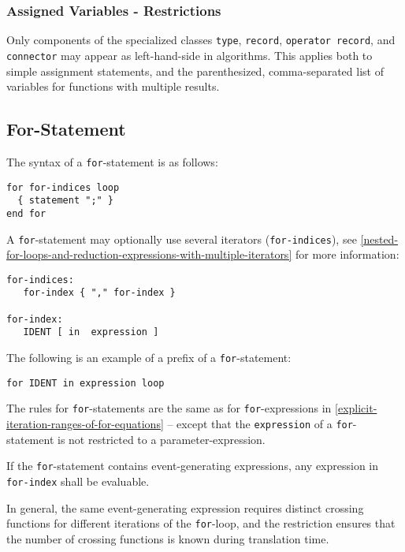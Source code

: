 \subsubsection{Assigned Variables - Restrictions}\label{restrictions-on-assigned-variables}\label{assigned-variables-restrictions}

Only components of the specialized classes \lstinline!type!, \lstinline!record!, \lstinline!operator record!, and \lstinline!connector! may appear as left-hand-side in algorithms.
This applies both to simple assignment statements, and the parenthesized, comma-separated list of variables for functions with multiple results.

\subsection{For-Statement}\label{for-statement}

The syntax of a \lstinline!for!-statement is as follows:
\begin{lstlisting}[language=grammar]
for for-indices loop
  { statement ";" }
end for
\end{lstlisting}
A \lstinline!for!-statement may optionally use several iterators (\lstinline!for-indices!), see \cref{nested-for-loops-and-reduction-expressions-with-multiple-iterators} for more information:
\begin{lstlisting}[language=grammar]
for-indices:
   for-index { "," for-index }

for-index:
   IDENT [ in  expression ]
\end{lstlisting}
The following is an example of a prefix of a \lstinline!for!-statement:
\begin{lstlisting}[language=modelica]
for IDENT in expression loop
\end{lstlisting}
The rules for \lstinline!for!-statements are the same as for \lstinline!for!-expressions in \cref{explicit-iteration-ranges-of-for-equations} -- except that the \lstinline!expression! of a \lstinline!for!-statement is not restricted to a parameter-expression.

If the \lstinline!for!-statement contains event-generating expressions, any expression in \lstinline[language=grammar]!for-index! shall be evaluable.

\begin{nonnormative}
In general, the same event-generating expression requires distinct crossing functions for different iterations of the \lstinline!for!-loop, and the restriction ensures that the number of crossing functions is known during translation time.
\end{nonnormative}

